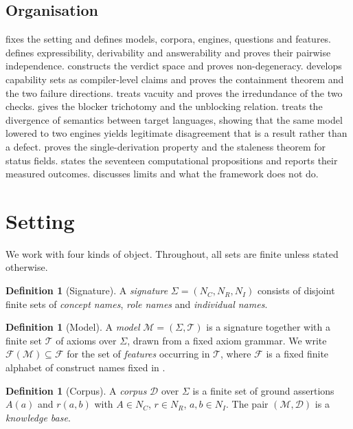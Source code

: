 \documentclass[11pt,a4paper]{article}
\theoremstyle{plain}
\theoremstyle{definition}
\newtheorem{definition}[theorem]{Definition}
\theoremstyle{remark}
\newcommand{\Model}{\mathcal{M}}          %
\newcommand{\Corpus}{\mathcal{D}}         %
\newcommand{\Feat}{\mathcal{F}}           %
\begin{document}
\subsection{Organisation}

 fixes the setting and defines models, corpora, engines,
questions and features.  defines expressibility, derivability
and answerability and proves their pairwise independence. 
constructs the verdict space and proves non-degeneracy. 
develops capability sets as compiler-level claims and proves the containment
theorem and the two failure directions.  treats vacuity and
proves the irredundance of the two checks.  gives the
blocker trichotomy and the unblocking relation.  treats
the divergence of semantics between target languages, showing that the same
model lowered to two engines yields legitimate disagreement that is a result
rather than a defect.  proves the single-derivation property
and the staleness theorem for status fields.  states the
seventeen computational propositions and reports their measured outcomes.
 discusses limits and what the framework does not do.

\section{Setting}
\label{sec:setting}

We work with four kinds of object. Throughout, all sets are finite unless
stated otherwise.

\begin{definition}[Signature]
\label{def:signature}
A \emph{signature} $\Sigma = (N_C, N_R, N_I)$ consists of disjoint finite sets
of \emph{concept names}, \emph{role names} and \emph{individual names}.
\end{definition}

\begin{definition}[Model]
\label{def:model}
A \emph{model} $\Model = (\Sigma, \mathcal{T})$ is a signature together with a
finite set $\mathcal{T}$ of axioms over $\Sigma$, drawn from a fixed axiom
grammar. We write $\Feat(\Model) \subseteq \Feat$ for the set of
\emph{features} occurring in $\mathcal{T}$, where $\Feat$ is a fixed finite
alphabet of construct names fixed in .
\end{definition}

\begin{definition}[Corpus]
\label{def:corpus}
A \emph{corpus} $\Corpus$ over $\Sigma$ is a finite set of ground assertions
$A(a)$ and $r(a,b)$ with $A \in N_C$, $r \in N_R$, $a,b \in N_I$. The pair
$(\Model, \Corpus)$ is a \emph{knowledge base}.
\end{definition}
\end{document}
